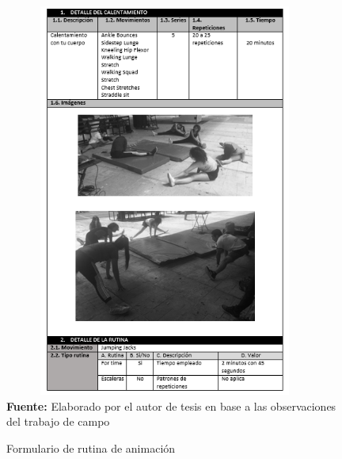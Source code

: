 \begin{figure}[H]
	\caption{Formulario de rutina de animaci\'on}
	\label{fig:frmRoutCher}
	\centering	\includegraphics[width=400px,height=490px]{graphics/resultados/rutina-cheerleaders.PNG} \\
	\textbf{Fuente:} Elaborado por el autor de tesis en base a las observaciones del trabajo de campo
\end{figure}
